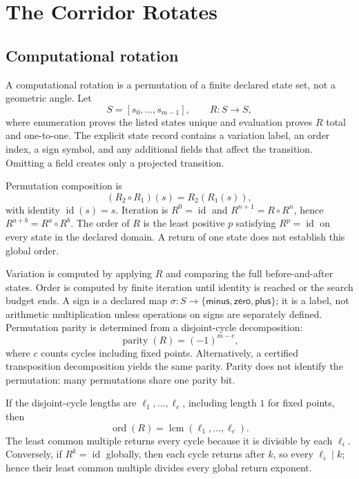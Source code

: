 \chapter{The Corridor Rotates}

\section{Computational rotation}

A computational rotation is a permutation of a finite declared state set, not a geometric angle.  Let
\[
S=[s_0,\ldots,s_{m-1}],\qquad R:S\to S,
\]
where enumeration proves the listed states unique and evaluation proves \(R\) total and one-to-one.  The explicit
state record contains a variation label, an order index, a sign symbol, and any additional fields that affect the
transition.  Omitting a field creates only a projected transition.

Permutation composition is
\[
                    (R_2\circ R_1)(s)=R_2(R_1(s)),
\]
with identity \(\operatorname{id}(s)=s\).  Iteration is \(R^0=\operatorname{id}\) and
\(R^{n+1}=R\circ R^n\), hence \(R^{a+b}=R^a\circ R^b\).  The order of \(R\) is the least positive \(p\) satisfying
\(R^p=\operatorname{id}\) on every state in the declared domain.  A return of one state does not establish this
global order.

Variation is computed by applying \(R\) and comparing the full before-and-after states.  Order is computed by finite
iteration until identity is reached or the search budget ends.  A sign is a declared map
\(\sigma:S\to\{\mathsf{minus},\mathsf{zero},\mathsf{plus}\}\); it is a label, not arithmetic multiplication unless
operations on signs are separately defined.  Permutation parity is determined from a disjoint-cycle decomposition:
\[
                         \operatorname{parity}(R)=(-1)^{m-c},
\]
where \(c\) counts cycles including fixed points.  Alternatively, a certified transposition decomposition yields the
same parity.  Parity does not identify the permutation: many permutations share one parity bit.

If the disjoint-cycle lengths are \(\ell_1,\ldots,\ell_c\), including length \(1\) for fixed points, then
\[
                       \operatorname{ord}(R)=\operatorname{lcm}(\ell_1,\ldots,\ell_c).
\]
The least common multiple returns every cycle because it is divisible by each \(\ell_i\).  Conversely, if
\(R^k=\operatorname{id}\) globally, then each cycle returns after \(k\), so every \(\ell_i\mid k\); hence their least
common multiple divides every global return exponent.

